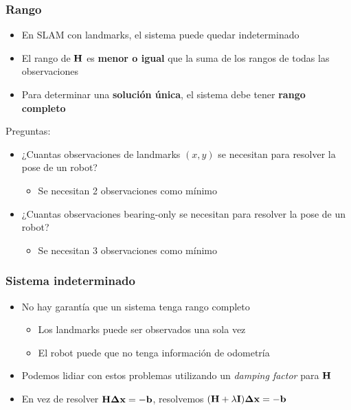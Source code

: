 \begin{frame}
    \frametitle{Rango}
    \begin{itemize}
        \item En SLAM con landmarks, el sistema puede quedar indeterminado
        \item El rango de $\boldsymbol{\mathbf{H}}$ es {\bf menor o igual} que la suma de los rangos de todas las observaciones
        \item Para determinar una {\bf solución única}, el sistema debe tener {\bf rango completo}
    \end{itemize}

     {
        Preguntas:
    }

    \begin{itemize}
        \item<2-> ¿Cuantas observaciones de landmarks $(x,y)$ se necesitan para resolver la pose de un robot?
        \begin{itemize}
            \item<3-> Se necesitan 2 observaciones como mínimo
        \end{itemize}
        \item<4-> ¿Cuantas observaciones bearing-only se necesitan para resolver la pose de un robot?
        \begin{itemize}
            \item<5-> Se necesitan 3 observaciones como mínimo
        \end{itemize}
    \end{itemize}
\end{frame}

\begin{frame}
    \frametitle{Sistema indeterminado}
    \begin{itemize}
        \item No hay garantía que un sistema tenga rango completo
        \begin{itemize}
            \item Los landmarks puede ser observados una sola vez
            \item El robot puede que no tenga información de odometría 
        \end{itemize}
        \item Podemos lidiar con estos problemas utilizando un \emph{damping factor} para $\boldsymbol{\mathbf{H}}$
        \item En vez de resolver $\boldsymbol{\mathbf{H}} \boldsymbol{\mathbf{\Delta}} \boldsymbol{\mathbf{x}} = - \boldsymbol{\mathbf{b}}$, resolvemos
        $(\boldsymbol{\mathbf{H}} + \lambda \boldsymbol{\mathbf{I}}) \boldsymbol{\mathbf{\Delta}} \boldsymbol{\mathbf{x}} = - \boldsymbol{\mathbf{b}}$
    \end{itemize}
\end{frame}

